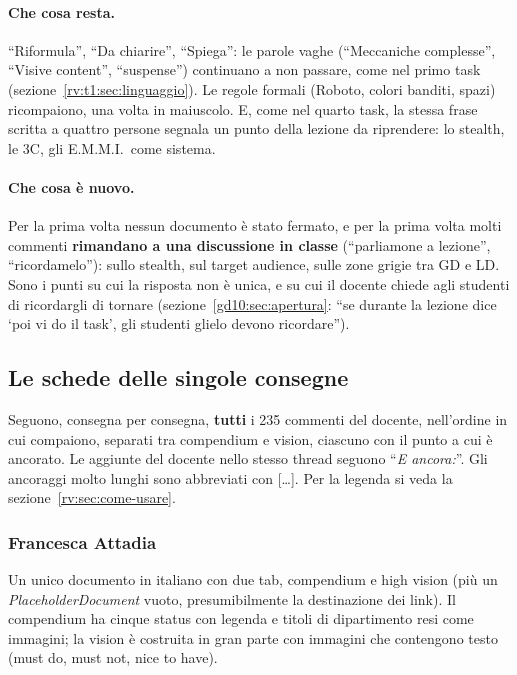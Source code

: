 \paragraph{Che cosa resta.} ``Riformula'', ``Da chiarire'', ``Spiega'': le
parole vaghe (``Meccaniche complesse'', ``Visive content'', ``suspense'')
continuano a non passare, come nel primo task (sezione~\ref{rv:t1:sec:linguaggio}).
Le regole formali (Roboto, colori banditi, spazi) ricompaiono, una volta in
maiuscolo. E, come nel quarto task, la stessa frase scritta a quattro
persone segnala un punto della lezione da riprendere: lo stealth, le 3C,
gli E.M.M.I.\ come sistema.

\paragraph{Che cosa è nuovo.} Per la prima volta nessun documento è stato
fermato, e per la prima volta molti commenti \textbf{rimandano a una
discussione in classe} (``parliamone a lezione'', ``ricordamelo''): sullo
stealth, sul target audience, sulle zone grigie tra GD e LD. Sono i punti su
cui la risposta non è unica, e su cui il docente chiede agli studenti di
ricordargli di tornare (sezione~\ref{gd10:sec:apertura}: ``se durante la
lezione dice `poi vi do il task', gli studenti glielo devono ricordare'').

\subsection{Le schede delle singole consegne}
\label{rv:t5:sec:schede}

Seguono, consegna per consegna, \textbf{tutti} i 235 commenti del docente,
nell'ordine in cui compaiono, separati tra compendium e vision, ciascuno con
il punto a cui è ancorato. Le aggiunte del docente nello stesso thread seguono
``\emph{E ancora:}''. Gli ancoraggi molto lunghi sono abbreviati con
[\dots]. Per la legenda si veda la sezione~\ref{rv:sec:come-usare}.

\subsubsection{Francesca Attadia}
Un unico documento in italiano con due tab, compendium e high vision (più un \emph{PlaceholderDocument} vuoto, presumibilmente la destinazione dei link). Il compendium ha cinque status con legenda e titoli di dipartimento resi come immagini; la vision è costruita in gran parte con immagini che contengono testo (must do, must not, nice to have).
